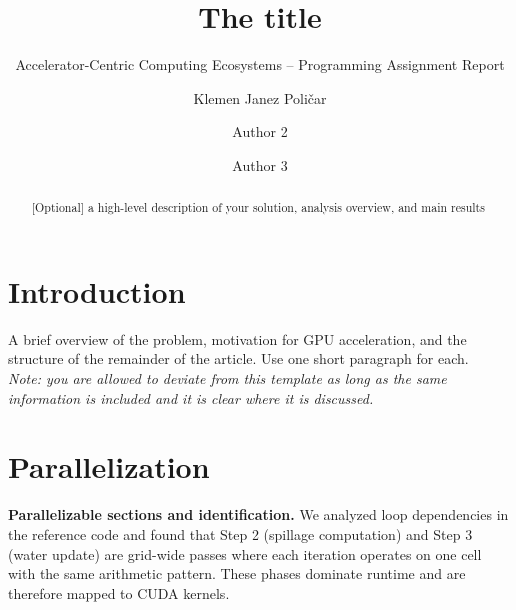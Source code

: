 \documentclass[sigconf, nonacm, review]{acmart}
\begin{document}
\title{The title}
\subtitle{Accelerator-Centric Computing Ecosystems -- Programming Assignment Report }



\author{Klemen Janez Poličar}

\author{Author 2}
\author{Author 3}


\begin{abstract}
  [Optional]  a high-level description of your solution, analysis overview, and main results
\end{abstract}




\maketitle

\section{Introduction}
A brief overview of the problem, motivation for GPU acceleration, and the structure of the remainder of the article. Use one short paragraph for each.\\

\noindent
\textit{Note: you are allowed to deviate from this template as long as the same information is included and it is clear where it is discussed.}

\section{Parallelization}
\textbf{Parallelizable sections and identification.}
We analyzed loop dependencies in the reference code and found that Step 2 (spillage computation) and Step 3 (water update) are grid-wide passes where each iteration operates on one cell with the same arithmetic pattern. These phases dominate runtime and are therefore mapped to CUDA kernels.
\end{document}
